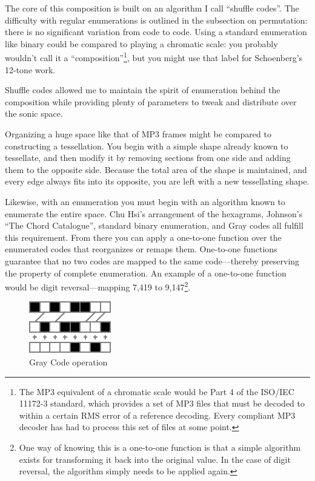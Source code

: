 \documentclass{thesis}
\begin{document}
The core of this composition is built on an algorithm I call ``shuffle codes''. The difficulty with regular enumerations is outlined in the subsection on permutation: there is no significant variation from code to code. Using a standard enumeration like binary could be compared to playing a chromatic scale: you probably wouldn't call it a ``composition''\footnote{The MP3 equivalent of a chromatic scale would be Part 4 of the ISO/IEC 11172-3 standard, which provides a set of MP3 files that must be decoded to within a certain RMS error of a reference decoding. Every compliant MP3 decoder has had to process this set of files at some point.}, but you might use that label for Schoenberg's 12-tone work.

Shuffle codes allowed me to maintain the spirit of enumeration behind the composition while providing plenty of parameters to tweak and distribute over the sonic space.

Organizing a huge space like that of MP3 frames might be compared to constructing a tessellation. You begin with a simple shape already known to tessellate, and then modify it by removing sections from one side and adding them to the opposite side. Because the total area of the shape is maintained, and every edge always fits into its opposite, you are left with a new tessellating shape.

Likewise, with an enumeration you must begin with an algorithm known to enumerate the entire space. Chu Hsi's arrangement of the hexagrams, Johnson's ``The Chord Catalogue'', standard binary enumeration, and Gray codes all fulfill this requirement. From there you can apply a one-to-one function over the enumerated codes that reorganizes or remaps them. One-to-one functions guarantee that no two codes are mapped to the same code---thereby preserving the property of complete enumeration. An example of a one-to-one function would be digit reversal---mapping 7,419 to 9,147\footnote{One way of knowing this is a one-to-one function is that a simple algorithm exists for transforming it back into the original value. In the case of digit reversal, the algorithm simply needs to be applied again.}.

\begin{figure}
	\begin{center}
		\includegraphics[scale=1.5]{graphics/gray-operation.pdf}
		\caption{Gray Code operation}
		\label{gray-operation}
	\end{center}
\end{figure}
\end{document}
